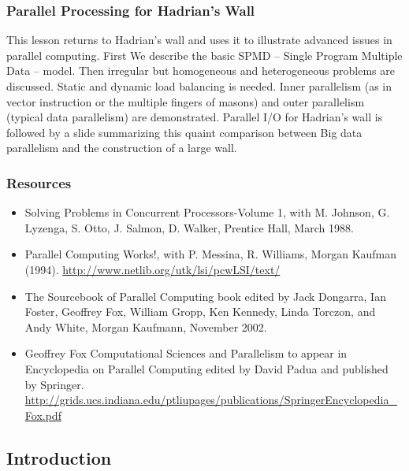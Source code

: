 
\subsubsection{Parallel Processing for Hadrian's Wall}

This lesson returns to Hadrian's wall and uses it to illustrate advanced
issues in parallel computing. First We describe the basic SPMD -- Single
Program Multiple Data -- model. Then irregular but homogeneous and
heterogeneous problems are discussed. Static and dynamic load balancing
is needed. Inner parallelism (as in vector instruction or the multiple
fingers of masons) and outer parallelism (typical data parallelism) are
demonstrated. Parallel I/O for Hadrian's wall is followed by a slide
summarizing this quaint comparison between Big data parallelism and the
construction of a large wall.


\subsubsection{Resources}\label{resources}

\begin{itemize}
\item
  Solving Problems in Concurrent Processors-Volume 1, with M. Johnson,
  G. Lyzenga, S. Otto, J. Salmon, D. Walker, Prentice Hall, March 1988.
\item
  Parallel Computing Works!, with P. Messina, R. Williams, Morgan
  Kaufman (1994). \url{http://www.netlib.org/utk/lsi/pcwLSI/text/}
\item
  The Sourcebook of Parallel Computing book edited by Jack Dongarra, Ian
  Foster, Geoffrey Fox, William Gropp, Ken Kennedy, Linda Torczon, and
  Andy White, Morgan Kaufmann, November 2002.
\item
  Geoffrey Fox Computational Sciences and Parallelism to appear in
  Encyclopedia on Parallel Computing edited by David Padua and published
  by Springer.
  \url{http://grids.ucs.indiana.edu/ptliupages/publications/SpringerEncyclopedia_Fox.pdf}
\end{itemize}

\subsection{Introduction}

